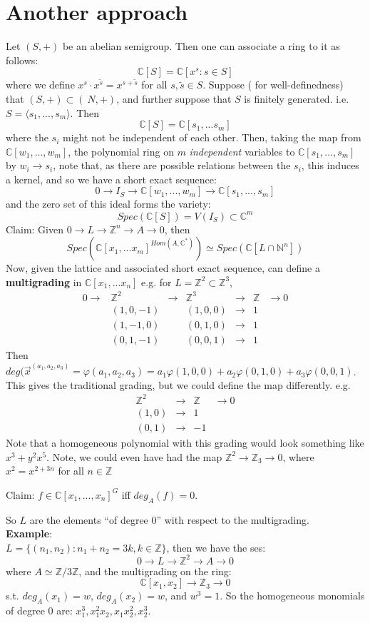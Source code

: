 \documentclass{article}
\newcommand{\C}{\mathbb{C}}
\newcommand{\N}{\mathbb{N}}
\newcommand{\Z}{\mathbb{Z}}
\begin{document}
	\section{Another approach}
	Let $(S,+)$ be an abelian semigroup. Then one can associate 
	a ring to it as follows: $$\C[S]=\C
	[x^s: s\in S]$$ where we define $x^s\cdot x^{\tilde{s}}=
	x^{s+\tilde{s}}$ for all $s,\tilde{s}\in S$. Suppose (
	for well-definedness) that $(S,+)\subset(\ {N},+)$, 
	and further suppose that $S$ is finitely generated. i.e. 
	$S=\langle s_1,...,s_m\rangle$. Then 
	$$\C[S]=\C[s_1,...s_m]$$ where the 
	$s_i$ might not be independent of each other. 
	Then, taking the map from $\C[w_1,...,w_m]$, 
	the polynomial ring on $m$ \emph{independent} variables 
	to $\C[s_1,...,s_m]$ by $w_i\to s_i$, note that, 
	as there are possible relations between the $s_i$, this 
	induces a kernel, and so we have a short exact sequence: 
	$$0\to I_S\to\C[w_1,...,w_m]\to\C[ s_1,...,s_m]$$ 
	and the zero set of this ideal forms the 
	variety: $$Spec(\C[S])=V(I_S)\subset\C^m$$
	Claim: Given $0\to L\to\Z^n\to A\to0$, then 
	$$Spec\left(\C[x_1,...x_m]^{Hom(A,\C^*)}\right)
	\simeq Spec(\C[L\cap\N^n])$$
	Now, given the lattice and associated short exact sequence, 
	can define a \textbf{multigrading} in $\C[x_1,...x_n]$ 
	e.g. for $L=\Z^2\subset\Z^3$, 
	$$\begin{array}{rcccccl}
		0\to&\Z^2&\to&\Z^3&\to&\Z&\to0\\
		&(1,0,-1)&&(1,0,0)&\to&1&\\
		&(1,-1,0)&&(0,1,0)&\to&1&\\
		&(0,1,-1)&&(0,0,1)&\to&1&
	\end{array}$$
	Then $deg(\vec{x}^{(a_1,a_2,a_3)}=\varphi(a_1,a_2,a_3)
	=a_1\varphi(1,0,0)+a_2\varphi(0,1,0)+a_3\varphi(0,0,1)$. 
	This gives the traditional grading, but we could define 
	the map differently. e.g.
	$$\begin{array}{cccl}
		\Z^2&\to&\Z&\to0\\
		(1,0)&\to&1&\\
		(0,1)&\to&-1&
	\end{array}$$
	Note that a homogeneous polynomial with this grading would 
	look something like $x^3+y^2x^5$. Note, we could even have 
	had the map $\Z^2\to\Z_3\to0$, where 
	$x^2=x^{2+3n}$ for all $n\in\Z$

	Claim: $f\in\C[x_1,...,x_n]^G$ iff $deg_A(f)=0$. 

	So $L$ are the elements ``of degree 0'' with respect to the 
	multigrading. 
	\\\noindent\textbf{Example}:\\
		$L=\{(n_1,n_2):n_1+n_2=3k, k\in\Z\}$, then 
		we have the ses: $$0\to L\to\Z^2\to A\to0$$
		where $A\simeq\Z/3\Z$, and the 
		multigrading on the ring: 
		$$\C[x_1,x_2]\to\Z_3\to0$$
		s.t. $deg_A(x_1)=w$, $deg_A(x_2)=w$, and $w^3=1$. 
		So the homogeneous monomials of degree 0 are: 
		$x_1^3, x_1^2x_2, x_1x_2^2, x_2^3$.
\end{document}
